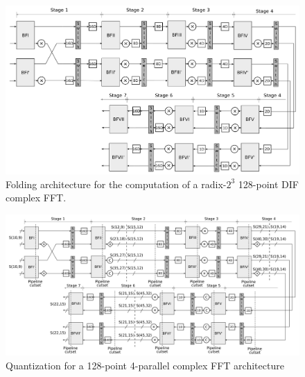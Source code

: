 \documentclass[journal,comsoc]{IEEEtran}
\begin{document}







\begin{figure} 
	\centering
	\includegraphics[width=0.6\linewidth]{Diagramas/folding-128.png}
	\caption{Folding architecture for the computation of a radix-$2^3$ 128-point DIF complex FFT.}
	\label{fig:folding_128}
\end{figure}


\begin{figure} 
	\centering
	\includegraphics[width=0.8\linewidth]{Diagramas/folding-128-quant-pipe.png}
	\caption{Quantization for a 128-point 4-parallel complex FFT architecture}
	\label{fig:4paralelo128pradix8cuantizacion1}
\end{figure}
\end{document}
